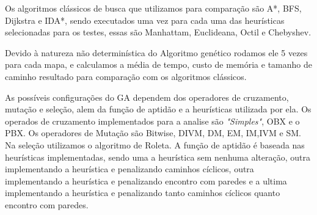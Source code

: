 \begin{minipage}{\linewidth}
 	\label{fig:with_diagonals}
\end{minipage}

Os algoritmos clássicos de busca que utilizamos para comparação são A\**, BFS, Dijkstra e IDA*, sendo executados uma vez para cada uma das heurísticas selecionadas para os testes, essas são Manhattam, Euclideana, Octil e Chebyshev.
  
Devido à natureza não determinística do Algoritmo genético rodamos ele 5 vezes para cada mapa, e calculamos a média de tempo, custo de memória e tamanho de caminho resultado para comparação com os algoritmos clássicos.
 
As possíveis configurações do GA dependem dos operadores de cruzamento, mutação e seleção, alem da função de aptidão e a heurísticas utilizada por ela. Os operados de cruzamento implementados para a analise são \textit{"Simples"}, OBX e o PBX. Os operadores de Mutação são Bitwise, DIVM, DM, EM, IM,IVM e SM. Na seleção utilizamos o algoritmo de Roleta. A função de aptidão é baseada nas heurísticas implementadas, sendo uma a heurística sem nenhuma alteração, outra implementando a heurística e penalizando caminhos cíclicos, outra implementando a heurística e penalizando encontro com paredes e a ultima implementando a heurística e penalizando tanto caminhos cíclicos quanto encontro com paredes.
 
